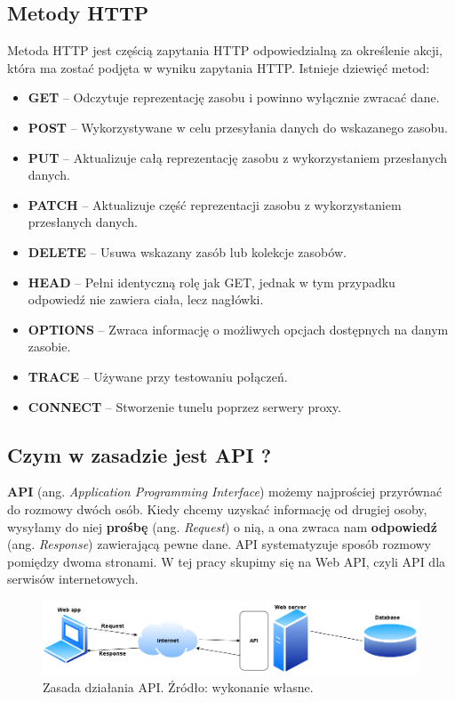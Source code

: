 \documentclass[oneside,polski,logo,indent]{amuthesis}
\begin{document}
\begin{center}
\subsection{Metody HTTP}
\end{center}
Metoda HTTP jest częścią zapytania HTTP odpowiedzialną za określenie akcji, która ma zostać podjęta w wyniku zapytania HTTP. Istnieje dziewięć metod:

\begin{itemize}
\item \textbf{GET} -- Odczytuje reprezentację zasobu i powinno wyłącznie zwracać dane.
\item \textbf{POST} -- Wykorzystywane w celu przesyłania danych do wskazanego zasobu.
\item \textbf{PUT} -- Aktualizuje całą reprezentację zasobu z wykorzystaniem przesłanych danych.
\item \textbf{PATCH} -- Aktualizuje część reprezentacji zasobu z wykorzystaniem przesłanych danych.
\item \textbf{DELETE} -- Usuwa wskazany zasób lub kolekcje zasobów.
\item \textbf{HEAD} -- Pełni identyczną rolę jak GET, jednak w tym przypadku odpowiedź nie zawiera ciała, lecz nagłówki.
\item \textbf{OPTIONS} -- Zwraca informację o możliwych opcjach dostępnych na danym zasobie.
\item \textbf{TRACE} -- Używane przy testowaniu połączeń.
\item \textbf{CONNECT} -- Stworzenie tunelu poprzez serwery proxy.
\end{itemize}


\begin{center}
\subsection{Czym w zasadzie jest API ?}
\end{center}
\textbf{API} (ang. \emph{Application Programming Interface}) możemy najprościej przyrównać do rozmowy dwóch osób. Kiedy chcemy uzyskać informację od drugiej osoby,  wysyłamy do niej \textbf{prośbę} (ang. \emph{Request}) o nią, a ona zwraca nam \textbf{odpowiedź} (ang. \emph{Response}) zawierającą pewne dane.  API systematyzuje sposób rozmowy pomiędzy dwoma stronami. W tej pracy skupimy się na Web API, czyli API dla serwisów internetowych. 
\begin{center}
\begin{figure}[H]
\centering
\includegraphics[width=14cm]{api.png}
\caption{ Zasada działania API. Źródło: wykonanie własne.}
\label{Cache}
\end{figure}
\end{center}
\end{document}

